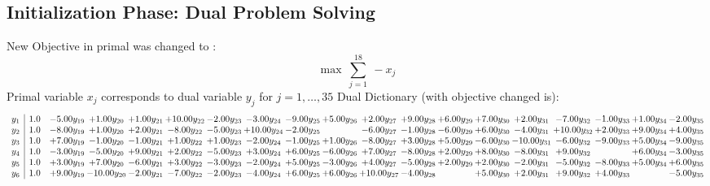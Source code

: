 \documentclass[9pt]{article}
\begin{document}
\subsection{Initialization Phase: Dual Problem Solving}
New Objective in primal was changed to : \[ \max\ \sum_{j=1}^{18}\ - x_j \] 
Primal variable $x_j$ corresponds to dual variable $y_j$ for $j = 1,\ldots,35$
Dual Dictionary (with objective changed is): 
\[\begin{array}{c| c c@{\hskip 2pt} c@{\hskip 2pt} c@{\hskip 2pt} c@{\hskip 2pt} c@{\hskip 2pt} c@{\hskip 2pt} c@{\hskip 2pt} c@{\hskip 2pt} c@{\hskip 2pt} c@{\hskip 2pt} c@{\hskip 2pt} c@{\hskip 2pt} c@{\hskip 2pt} c@{\hskip 2pt} c@{\hskip 2pt} c@{\hskip 2pt} c@{\hskip 2pt} }
 y_{1}   &  1.0 & -5.00 y_{19} & +  1.00 y_{20} & +  1.00 y_{21} & + 10.00 y_{22} & -2.00 y_{23} & -3.00 y_{24} & -9.00 y_{25} & +  5.00 y_{26} & +  2.00 y_{27} & +  9.00 y_{28} & +  6.00 y_{29} & +  7.00 y_{30} & +  2.00 y_{31} & -7.00 y_{32} & -1.00 y_{33} & +  1.00 y_{34} & -2.00 y_{35}\\
 y_{2}   &  1.0 & -8.00 y_{19} & +  1.00 y_{20} & +  2.00 y_{21} & -8.00 y_{22} & -5.00 y_{23} & + 10.00 y_{24} & -2.00 y_{25} &   & -6.00 y_{27} & -1.00 y_{28} & -6.00 y_{29} & +  6.00 y_{30} & -4.00 y_{31} & + 10.00 y_{32} & +  2.00 y_{33} & +  9.00 y_{34} & +  4.00 y_{35}\\
 y_{3}   &  1.0 & +  7.00 y_{19} & -1.00 y_{20} & -1.00 y_{21} & +  1.00 y_{22} & +  1.00 y_{23} & -2.00 y_{24} & -1.00 y_{25} & +  1.00 y_{26} & -8.00 y_{27} & +  3.00 y_{28} & +  5.00 y_{29} & -6.00 y_{30} & -10.00 y_{31} & -6.00 y_{32} & -9.00 y_{33} & +  5.00 y_{34} & -9.00 y_{35}\\
 y_{4}   &  1.0 & -3.00 y_{19} & -5.00 y_{20} & +  9.00 y_{21} & +  2.00 y_{22} & -5.00 y_{23} & +  3.00 y_{24} & +  6.00 y_{25} & -6.00 y_{26} & +  7.00 y_{27} & -8.00 y_{28} & +  2.00 y_{29} & +  8.00 y_{30} & -8.00 y_{31} & +  9.00 y_{32} &   & +  6.00 y_{34} & -3.00 y_{35}\\
 y_{5}   &  1.0 & +  3.00 y_{19} & +  7.00 y_{20} & -6.00 y_{21} & +  3.00 y_{22} & -3.00 y_{23} & -2.00 y_{24} & +  5.00 y_{25} & -3.00 y_{26} & +  4.00 y_{27} & -5.00 y_{28} & +  2.00 y_{29} & +  2.00 y_{30} & -2.00 y_{31} & -5.00 y_{32} & -8.00 y_{33} & +  5.00 y_{34} & +  6.00 y_{35}\\
 y_{6}   &  1.0 & +  9.00 y_{19} & -10.00 y_{20} & -2.00 y_{21} & -7.00 y_{22} & -2.00 y_{23} & -4.00 y_{24} & +  6.00 y_{25} & +  6.00 y_{26} & + 10.00 y_{27} & -4.00 y_{28} &   & +  5.00 y_{30} & +  2.00 y_{31} & +  9.00 y_{32} & +  4.00 y_{33} &   & -5.00 y_{35}\\

\end{array}\]
\end{document}
